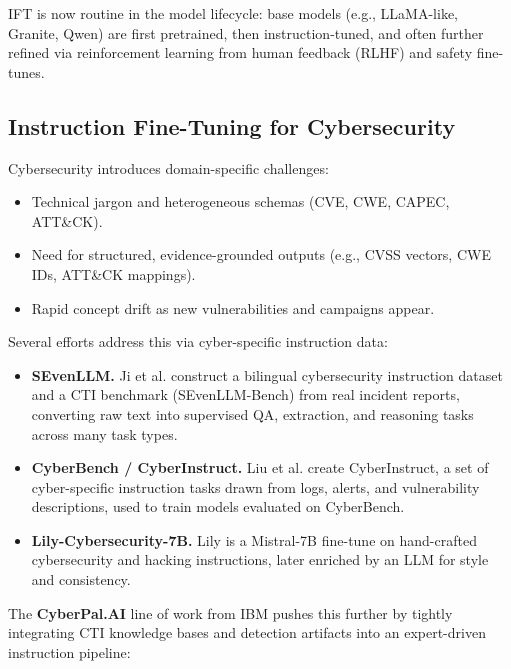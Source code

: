 \documentclass[10pt]{article}
\begin{document}
IFT is now routine in the model lifecycle: base models (e.g., LLaMA-like, Granite, Qwen) are first pretrained, then instruction-tuned, and often further refined via reinforcement learning from human feedback (RLHF) and safety fine-tunes.\cite{ouyang2022instructgpt}

\subsection{Instruction Fine-Tuning for Cybersecurity}

Cybersecurity introduces domain-specific challenges:

\begin{itemize}[leftmargin=*]
  \item Technical jargon and heterogeneous schemas (CVE, CWE, CAPEC, ATT\&CK).
  \item Need for structured, evidence-grounded outputs (e.g., CVSS vectors, CWE IDs, ATT\&CK mappings).
  \item Rapid concept drift as new vulnerabilities and campaigns appear.
\end{itemize}

Several efforts address this via cyber-specific instruction data:

\begin{itemize}[leftmargin=*]
  \item \textbf{SEvenLLM.} Ji et al. construct a bilingual cybersecurity instruction dataset and a CTI benchmark (SEvenLLM-Bench) from real incident reports, converting raw text into supervised QA, extraction, and reasoning tasks across many task types.\cite{ji2024sevenllm}
  \item \textbf{CyberBench / CyberInstruct.} Liu et al. create CyberInstruct, a set of cyber-specific instruction tasks drawn from logs, alerts, and vulnerability descriptions, used to train models evaluated on CyberBench.\cite{liu2024cyberbench}
  \item \textbf{Lily-Cybersecurity-7B.} Lily is a Mistral-7B fine-tune on hand-crafted cybersecurity and hacking instructions, later enriched by an LLM for style and consistency.\cite{liu2024cyberbench}
\end{itemize}

The \textbf{CyberPal.AI} line of work from IBM pushes this further by tightly integrating CTI knowledge bases and detection artifacts into an expert-driven instruction pipeline:
\end{document}
